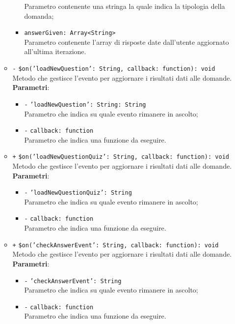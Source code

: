 \begin{itemize}
\begin{itemize}
\begin{itemize}
			Parametro contenente una stringa la quale indica la tipologia della domanda;
			\item \texttt{answerGiven: Array<String>} \\
			Parametro contenente l'array di risposte date dall'utente aggiornato all'ultima iterazione.
		\end{itemize}
		\item \texttt{-} \texttt{\$on('loadNewQuestion': String, callback: function): void} \\
		Metodo che gestisce l'evento per aggiornare i risultati dati alle domande. \\
		\textbf{Parametri}:
		\begin{itemize}
			\item \texttt{-} \texttt{'loadNewQuestion': String: String} \\
			Parametro che indica su quale evento rimanere in ascolto;
			\item \texttt{-} \texttt{callback: function} \\
			Parametro che indica una funzione da eseguire.
		\end{itemize}
		\item \texttt{+} \texttt{\$on('loadNewQuestionQuiz': String, callback: function): void} \\
		Metodo che gestisce l'evento per aggiornare i risultati dati alle domande. \\
		\textbf{Parametri}:
		\begin{itemize}
			\item \texttt{-} \texttt{'loadNewQuestionQuiz': String} \\
			Parametro che indica su quale evento rimanere in ascolto;
			\item \texttt{-} \texttt{callback: function} \\
			Parametro che indica una funzione da eseguire.
		\end{itemize}
		\item \texttt{+} \texttt{\$on('checkAnswerEvent': String, callback: function): void} \\
		Metodo che gestisce l'evento per aggiornare i risultati dati alle domande. \\
		\textbf{Parametri}:
		\begin{itemize}
			\item \texttt{-} \texttt{'checkAnswerEvent': String} \\
			Parametro che indica su quale evento rimanere in ascolto;
			\item \texttt{-} \texttt{callback: function} \\
			Parametro che indica una funzione da eseguire.
		\end{itemize}
	\end{itemize}
\end{itemize}

